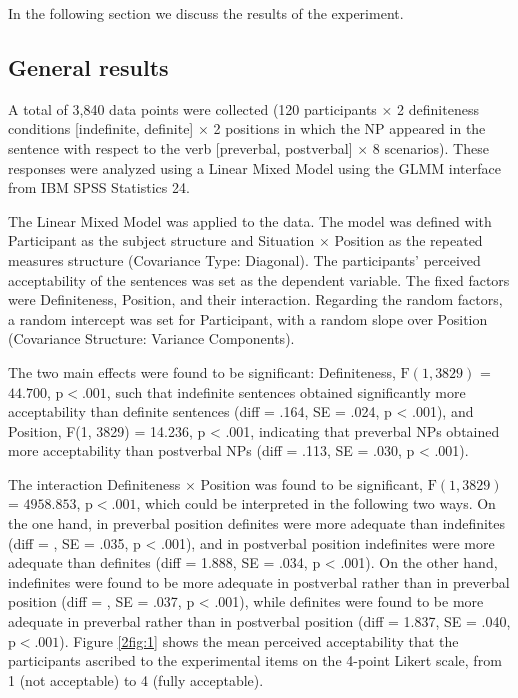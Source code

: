\documentclass[output=paper]{langsci/langscibook}
\begin{document}
In the following section we discuss the results of the experiment.

\subsection{General results}\label{2sec:33}

A total of 3,840 data points were collected (120 participants $\times$ 2 definiteness conditions [indefinite, definite] $\times$ 2 positions in which the NP appeared in the sentence with respect to the verb [preverbal, postverbal] $\times$ 8 scenarios). These responses were analyzed using a Linear Mixed Model using the GLMM interface from IBM SPSS Statistics 24.

The Linear Mixed Model was applied to the data. The model was defined with Participant as the subject structure and Situation $\times$ Position as the repeated measures structure (Covariance Type: Diagonal). The participants' perceived acceptability of the sentences was set as the dependent variable. The fixed factors were Definiteness, Position, and their interaction. Regarding the random factors, a random intercept was set for Participant, with a random slope over Position (Covariance Structure: Variance Components).

The two main effects were found to be significant: Definiteness, $\text{F}(1, 3829)$ = $44.700$, $\text{p} < .001$, such that indefinite sentences obtained significantly more acceptability than definite sentences (diff = .164, SE = .024, p < .001), and Position, F(1, 3829) = 14.236, p < .001, indicating that preverbal NPs obtained more acceptability than postverbal NPs (diff = .113, SE = .030, p < .001).

{
The interaction Definiteness $\times$ Position was found to be significant, $\text{F}(1, 3829)$ = $4958.853$, $\text{p} < .001$, which could be interpreted in the following two ways. On the one hand, in preverbal position definites were more adequate than indefinites (diff = , SE = .035, p < .001), and in postverbal position indefinites were more adequate than definites (diff = 1.888, SE = .034, p < .001). On the other hand, indefinites were found to be more adequate in postverbal rather than in preverbal position (diff = , SE = .037, p < .001), while definites were found to be more adequate in preverbal rather than in postverbal position (diff = 1.837, SE = .040, $\text{p} < .001$). Figure \ref{2fig:1} shows the mean perceived acceptability that the participants ascribed to the experimental items on the 4-point Likert scale, from 1 (not acceptable) to 4 (fully acceptable).
}
\end{document}
